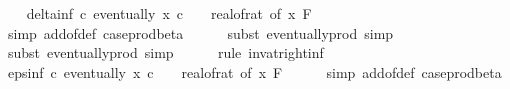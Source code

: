 \begin{isabellebody}
\isanewline
\ \ \isamarkupfalse%
\ delta{\isacharunderscore}{\kern0pt}inf{\isacharcolon}{\kern0pt}\ {\isachardoublequoteopen}{\isasymAnd}c{\isachardot}{\kern0pt}\ eventually\ {\isacharparenleft}{\kern0pt}{\isasymlambda}x{\isachardot}{\kern0pt}\ c\ {\isasymle}\ {}\ {\isacharslash}{\kern0pt}\ {\isacharparenleft}{\kern0pt}real{\isacharunderscore}{\kern0pt}of{\isacharunderscore}{\kern0pt}rat\ {\isacharparenleft}{\kern0pt}{\isasymdelta}{\isacharunderscore}{\kern0pt}of\ x{\isacharparenright}{\kern0pt}{\isacharparenright}{\kern0pt}{\isacharparenright}{\kern0pt}\ {\isacharquery}{\kern0pt}F{\isachardoublequoteclose}\isanewline
\ \ \ \ \isamarkupfalse%
\ {\isacharparenleft}{\kern0pt}simp\ add{\isacharcolon}{\kern0pt}{\isasymdelta}{\isacharunderscore}{\kern0pt}of{\isacharunderscore}{\kern0pt}def\ case{\isacharunderscore}{\kern0pt}prod{\isacharunderscore}{\kern0pt}beta{\isacharprime}{\kern0pt}{\isacharparenright}{\kern0pt}\isanewline
\ \ \ \ \isamarkupfalse%
\ {\isacharparenleft}{\kern0pt}subst\ eventually{\isacharunderscore}{\kern0pt}prod{}{\isacharprime}{\kern0pt}{\isacharcomma}{\kern0pt}\ simp{\isacharparenright}{\kern0pt}\isanewline
\ \ \ \ \isamarkupfalse%
\ {\isacharparenleft}{\kern0pt}subst\ eventually{\isacharunderscore}{\kern0pt}prod{}{\isacharprime}{\kern0pt}{\isacharcomma}{\kern0pt}\ simp{\isacharparenright}{\kern0pt}\isanewline
\ \ \ \ \isamarkupfalse%
\ {\isacharparenleft}{\kern0pt}rule\ inv{\isacharunderscore}{\kern0pt}at{\isacharunderscore}{\kern0pt}right{\isacharunderscore}{\kern0pt}{}{\isacharunderscore}{\kern0pt}inf{\isacharparenright}{\kern0pt}\isanewline
\isanewline
\ \ \isamarkupfalse%
\ eps{\isacharunderscore}{\kern0pt}inf{\isacharcolon}{\kern0pt}\ {\isachardoublequoteopen}{\isasymAnd}c{\isachardot}{\kern0pt}\ eventually\ {\isacharparenleft}{\kern0pt}{\isasymlambda}x{\isachardot}{\kern0pt}\ c\ {\isasymle}\ {}\ {\isacharslash}{\kern0pt}\ {\isacharparenleft}{\kern0pt}real{\isacharunderscore}{\kern0pt}of{\isacharunderscore}{\kern0pt}rat\ {\isacharparenleft}{\kern0pt}{\isasymepsilon}{\isacharunderscore}{\kern0pt}of\ x{\isacharparenright}{\kern0pt}{\isacharparenright}{\kern0pt}{\isacharparenright}{\kern0pt}\ {\isacharquery}{\kern0pt}F{\isachardoublequoteclose}\isanewline
\ \ \ \ \isamarkupfalse%
\ {\isacharparenleft}{\kern0pt}simp\ add{\isacharcolon}{\kern0pt}{\isasymepsilon}{\isacharunderscore}{\kern0pt}of{\isacharunderscore}{\kern0pt}def\ case{\isacharunderscore}{\kern0pt}prod{\isacharunderscore}{\kern0pt}beta{\isacharprime}{\kern0pt}{\isacharparenright}{\kern0pt}\isanewline

\end{isabellebody}
